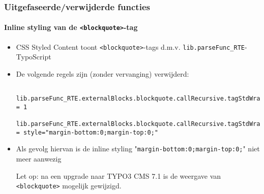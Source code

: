 
\begin{frame}[fragile]
	\frametitle{Uitgefaseerde/verwijderde functies}
	\framesubtitle{Inline styling van de \texttt{<blockquote>}-tag}

	\lstset{basicstyle=\tiny\ttfamily}

	\begin{itemize}

		\item CSS Styled Content toont \texttt{<blockquote>}-tags d.m.v. \texttt{lib.parseFunc\_RTE}-TypoScript
		\item De volgende regels zijn (zonder vervanging) verwijderd:

			\begin{lstlisting}
				lib.parseFunc_RTE.externalBlocks.blockquote.callRecursive.tagStdWrap.HTMLparser = 1
				lib.parseFunc_RTE.externalBlocks.blockquote.callRecursive.tagStdWrap.HTMLparser.tags.blockquote.overrideAttribs = style="margin-bottom:0;margin-top:0;"
			\end{lstlisting}

		\item Als gevolg hiervan is de inline styling "\texttt{margin-bottom:0;margin-top:0;}" niet meer aanwezig

			\vspace{0.2cm}

			\begingroup
				\color{red}
					Let op: na een upgrade naar TYPO3 CMS 7.1 is de weergave van \texttt{<blockquote>} mogelijk gewijzigd.
			\endgroup

	\end{itemize}

\end{frame}


